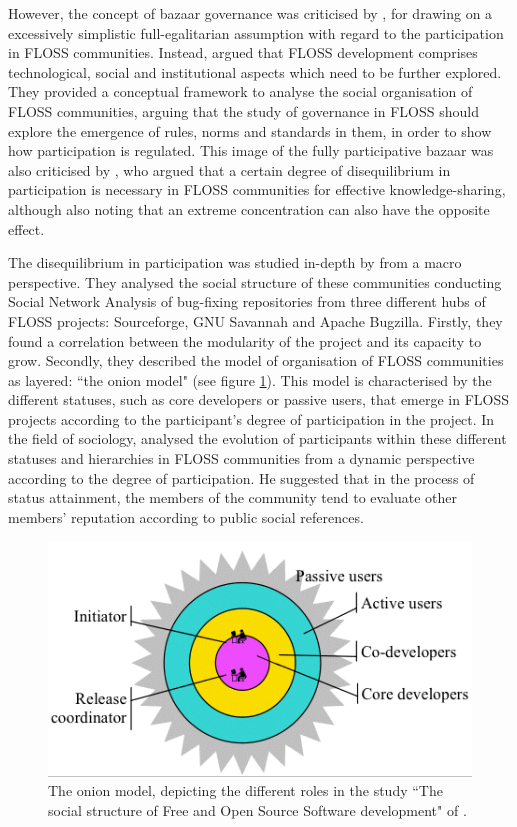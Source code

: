 However, the concept of bazaar governance was criticised by \textcite{mateos2008institutions}, for drawing on a excessively simplistic full-egalitarian assumption with regard to the participation in FLOSS communities. Instead, \textcite{mateos2008institutions} argued that FLOSS development comprises technological, social and institutional aspects which need to be further explored. They provided a conceptual framework to analyse the social organisation of FLOSS communities, arguing that the study of governance in FLOSS should explore the emergence of rules, norms and standards in them, in order to show how participation is regulated. This image of the fully participative bazaar was also criticised by \textcite{kuk2006strategic}, who argued that a certain degree of disequilibrium in participation is necessary in FLOSS communities for effective knowledge-sharing, although also noting that an extreme concentration can also have the opposite effect.  

The disequilibrium in participation was studied in-depth by \textcite{crowston2005social} from a macro perspective. They analysed the social structure of these communities conducting Social Network Analysis of bug-fixing repositories from three different hubs of FLOSS projects: Sourceforge, GNU Savannah and Apache Bugzilla. Firstly, they found a correlation between the modularity of the project and its capacity to grow. Secondly, they described the model of organisation of FLOSS communities as layered: ``the onion model" (see figure \ref{onion}). This model is characterised by the different statuses, such as core developers or passive users, that emerge in FLOSS projects according to the participant's degree of participation in the project. In the field of sociology, \textcite{Stewart2005} analysed the evolution of participants within these different statuses and hierarchies in FLOSS communities from a dynamic perspective according to the degree of participation. He suggested that in the process of status attainment, the members of the community tend to evaluate other members' reputation according to public social references.

\begin{figure}[H]
	\centering
	\includegraphics[scale=0.9]{img/onion.png}
	\caption[The onion model]%
	{The onion model, depicting the different roles in the study ``The social structure of Free and Open Source Software development" of \textcite{crowston2005social}.}
\label{onion}
\end{figure}
 
